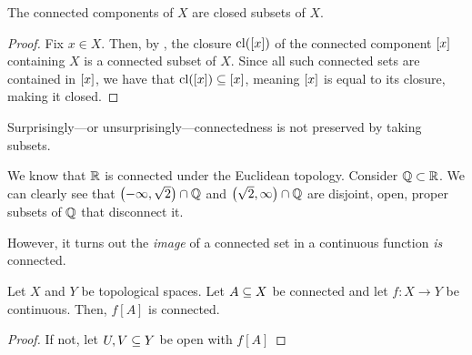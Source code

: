 \begin{boxcorollary}
    The connected components of $X$ are closed subsets of $X$.
\end{boxcorollary}
\begin{proof}
    Fix $x \in X$. Then, by , the closure $\operatorname{cl}\!\left( \left[ x \right] \right)$ of the connected component $\left[ x \right]$ containing $X$ is a connected subset of $X$. Since all such connected sets are contained in $\left[ x \right]$, we have that $\operatorname{cl}\!\left( \left[ x \right] \right) \subseteq \left[ x \right]$, meaning $\left[ x \right]$ is equal to its closure, making it closed.
\end{proof}

Surprisingly---or unsurprisingly---connectedness is not preserved by taking subsets.

\begin{boxcexample}
    We know that $\mathbb{R}$ is connected under the Euclidean topology. Consider $\mathbb{Q} \subset \mathbb{R}$. We can clearly see that $\left( -\infty, \sqrt{2} \right) \cap \mathbb{Q}$ and $\left( \sqrt{2}, \infty \right) \cap \mathbb{Q}$ are disjoint, open, proper subsets of $\mathbb{Q}$ that disconnect it.
\end{boxcexample}

However, it turns out the \textit{image} of a connected set in a continuous function \textit{is} connected.

\begin{boxlemma}
    Let $X$ and $Y$ be topological spaces. Let $A \subseteq X$ be connected and let $f : X \to Y$ be continuous. Then, $f[A]$ is connected.
\end{boxlemma}
\begin{proof}
    If not, let $U, V \subseteq Y$ be open with $f[A]$ \sorry
\end{proof}

